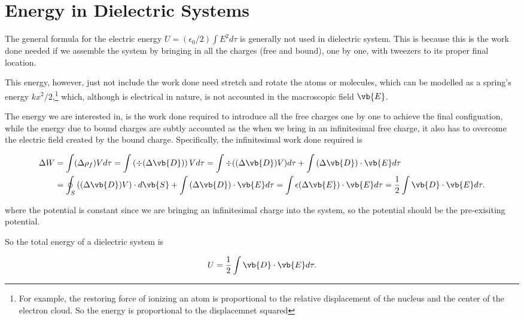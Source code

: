 \documentclass[english,a4paper,12pt]{report}
\begin{document}
\section{Energy in Dielectric Systems}

The general formula for the electric energy \( U = (\epsilon _{0}/2 ) \int E^2d\tau  \) is generally not used in dielectric system. This is because this is the work done needed if we assemble the system by bringing in all the charges (free and bound), one by one, with tweezers to its proper final location. 

This energy, however, just not include the work done need stretch and rotate the atoms or molecules, which can be modelled as a spring's energy \(kx^2 /2 \),\footnote{For example, the restoring force of ionizing an atom is proportional to the relative displacement of the nucleus and the center of the electron cloud. So the energy is proportional to the displacemnet squared} which, although is electrical in nature, is not accounted in the macroscopic field \(\vb{E} \). 

The energy we are interested in, is the work done required to introduce all the free charges one by one to achieve the final configuation, while the energy due to bound charges are subtly accounted as the when we bring in an infinitesimal free charge, it also has to overcome the electric field created by the bound charge. Specifically, the infinitesimal work done required is 

\begin{equation}
    \begin{aligned} 
    \Delta W &= \int (\Delta \rho _{f} ) V d\tau = \int \left( \div{(\Delta \vb{D} )}  \right) Vd\tau = \int \div{\left( (\Delta \vb{D} ) V\right)} d\tau + \int \left( \Delta \vb{D}  \right) \cdot \vb{E} d\tau \\
    &= \oint_{S} \left( (\Delta \vb{D} )V \right) \cdot d\vb{S} + \int \left( \Delta \vb{D}  \right) \cdot \vb{E} d\tau = \int \epsilon (\Delta \vb{E} )\cdot \vb{E} d\tau = \frac{1}{2}\int \vb{D} \cdot \vb{E} d\tau . 
    \end{aligned} 
\end{equation}

where the potential is constant since we are bringing an infinitesimal charge into the system, so the potential should be the pre-exisiting potential.

So the total energy of a dielectric system is 

\begin{equation}
    U = \frac{1}{2} \int \vb{D} \cdot \vb{E} d\tau  .
\end{equation}
\end{document}

